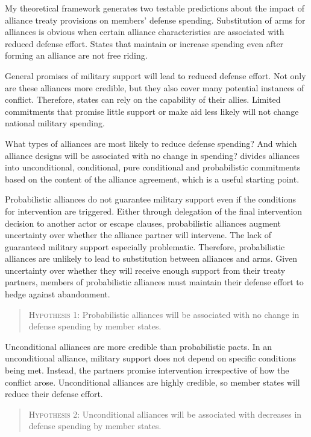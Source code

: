 \documentclass[12pt]{article}
\begin{document}
My theoretical framework generates two testable predictions about the impact of alliance treaty provisions on members' defense spending. Substitution of arms for alliances is obvious when certain alliance characteristics are associated with reduced defense effort. States that maintain or increase spending even after forming an alliance are not free riding. 

General promises of military support will lead to reduced defense effort. Not only are these alliances more credible, but they also cover many potential instances of conflict. Therefore, states can rely on the capability of their allies. Limited commitments that promise little support or make aid less likely will not change national military spending. 

What types of alliances are most likely to reduce defense spending? And which alliance designs will be associated with no change in spending? \citet{Benson2011, Benson2012} divides alliances into unconditional, conditional, pure conditional and probabilistic commitments based on the content of the alliance agreement, which is a useful starting point. 

Probabilistic alliances do not guarantee military support even if the conditions for intervention are triggered. Either through delegation of the final intervention decision to another actor or escape clauses, probabilistic alliances augment uncertainty over whether the alliance partner will intervene. The lack of guaranteed military support especially problematic. Therefore, probabilistic alliances are unlikely to lead to substitution between alliances and arms. Given uncertainty over whether they will receive enough support from their treaty partners, members of probabilistic alliances must maintain their defense effort to hedge against abandonment. 

\begin{quote}
\textsc{Hypothesis 1}: Probabilistic alliances will be associated with no change in defense spending by member states. 
\end{quote}

Unconditional alliances are more credible than probabilistic pacts. In an unconditional alliance, military support does not depend on specific conditions being met. Instead, the partners promise intervention irrespective of how the conflict arose. Unconditional alliances are highly credible, so member states will reduce their defense effort. 

\begin{quote}
\textsc{Hypothesis 2}: Unconditional alliances will be associated with decreases in defense spending by member states. 
\end{quote} 
\end{document}
